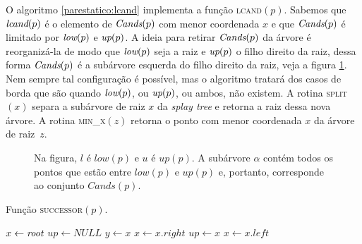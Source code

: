 O algoritmo \ref{parestatico:lcand} implementa a função \textsc{lcand}$(p)$.
Sabemos que $\textit{lcand}(p)$ é o elemento de $\textit{Cands}(p)$ com menor coordenada $x$
e que $\textit{Cands}(p)$ é limitado por $\textit{low}(p)$ e $\textit{up}(p)$. A ideia para retirar
$\textit{Cands}(p)$ da árvore é reorganizá-la de modo que $\textit{low}(p)$ seja a raiz e
$\textit{up}(p)$ o filho direito da raiz, dessa forma $\textit{Cands}(p)$ é a subárvore
esquerda do filho direito da raiz, veja a figura
\ref{fig:parestatico:loweup}. Nem sempre tal configuração é possível, mas o
algoritmo tratará dos casos de borda que são quando $\textit{low}(p)$, ou $\textit{up}(p)$,
ou ambos, não existem. A rotina \textsc{split}$(x)$ separa a subárvore de
raiz $x$ da \textit{splay tree} e retorna a raiz dessa nova árvore. A rotina
\textsc{min\_x}$(z)$ retorna o ponto com menor coordenada $x$ da árvore de
raiz~$z$.
\begin{figure}
    \centering
    \caption{Na figura, $l$ é $low(p)$ e $u$ é $up(p)$. A subárvore $\alpha$ contém todos os pontos que estão entre $low(p)$ e $up(p)$ e, portanto, corresponde ao conjunto $Cands(p)$.}
    \label{fig:parestatico:loweup}
\end{figure}
\begin{algorithm}
    \caption{Função \textsc{successor}$(p)$.}
    \label{parestatico:successor}
\begin{algorithmic}[1]
        \State $x \leftarrow \textit{root}$
        \State $up \leftarrow NULL$
            \State $y \leftarrow x$
                \State $x \leftarrow x.right$
            \Else
                \State $up \leftarrow x$
                \State $x \leftarrow x.left$
            \EndIf
        \EndWhile
         
            \State {}
        \EndIf
        \State {}
    \EndFunction
\end{algorithmic}
\end{algorithm}

